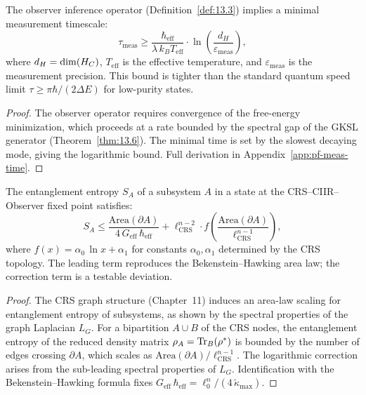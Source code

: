 \begin{theorem}\label{thm:14.16}
The observer inference operator (Definition~\ref{def:13.3}) implies a
minimal measurement timescale:
\begin{equation}\label{eq:meas-time}
  \tau_{\mathrm{meas}} \geq \frac{\hbar_{\mathrm{eff}}}
  {\lambda\,k_B T_{\mathrm{eff}}}
  \cdot \ln\!\left(\frac{d_H}{\varepsilon_{\mathrm{meas}}}\right),
\end{equation}
where $d_H = \dim(H_C)$, $T_{\mathrm{eff}}$ is the effective
temperature, and $\varepsilon_{\mathrm{meas}}$ is the measurement
precision.  This bound is tighter than the standard quantum speed
limit $\tau \geq \pi\hbar / (2\Delta E)$ for low-purity states.
\end{theorem}

\begin{proof}
The observer operator requires convergence of the
free-energy minimization, which proceeds at a rate bounded by
the spectral gap of the GKSL generator (Theorem~\ref{thm:13.6}).
The minimal time is set by the slowest decaying mode, giving
the logarithmic bound.  Full derivation in
Appendix~\ref{app:pf-meas-time}.
\end{proof}

\begin{theorem}\label{thm:14.17}
The entanglement entropy $S_A$ of a subsystem $A$ in a state at the
CRS--CIIR--Observer fixed point satisfies:
\begin{equation}\label{eq:ent-bound}
  S_A \leq \frac{\mathrm{Area}(\partial A)}{4\,G_{\mathrm{eff}}\,
  \hbar_{\mathrm{eff}}}
  + \ell_{\mathrm{CRS}}^{n-2}
  \cdot f\!\left(\frac{\mathrm{Area}(\partial A)}
  {\ell_{\mathrm{CRS}}^{n-1}}\right),
\end{equation}
where $f(x) = \alpha_0\,\ln x + \alpha_1$ for constants
$\alpha_0, \alpha_1$ determined by the CRS topology.  The leading
term reproduces the Bekenstein--Hawking area law; the correction
term is a testable deviation.
\end{theorem}

\begin{proof}
The CRS graph structure (Chapter~11) induces an area-law scaling
for entanglement entropy of subsystems, as shown by the spectral
properties of the graph Laplacian $L_G$.  For a bipartition
$A \cup B$ of the CRS nodes, the entanglement entropy of the
reduced density matrix $\rho_A = \mathrm{Tr}_B(\rho^*)$ is bounded by
the number of edges crossing $\partial A$, which scales as
$\mathrm{Area}(\partial A) / \ell_{\mathrm{CRS}}^{n-1}$.
The logarithmic correction arises from the sub-leading spectral
properties of $L_G$.  Identification with the Bekenstein--Hawking
formula fixes $G_{\mathrm{eff}}\,\hbar_{\mathrm{eff}} =
\ell_0^{n} / (4\,\tilde{\kappa}_{\max})$.
\end{proof}

